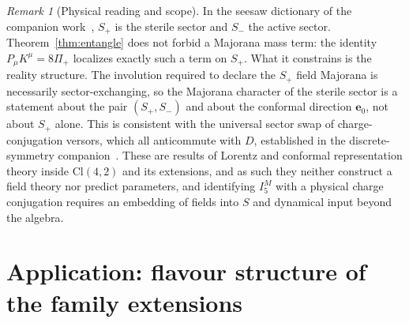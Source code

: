 \documentclass{birkjour}
\theoremstyle{definition}
\theoremstyle{remark}
\newtheorem{rem}[thm]{Remark}
\numberwithin{equation}{section}
\newcommand{\Cl}{\mathrm{Cl}}
\newcommand{\e}[1]{\bm{e}_{#1}}
\newenvironment{revblock}{}{}
\begin{document}
\begin{revblock}
\begin{rem}[Physical reading and scope]\label{rem:physical}
In the seesaw dictionary of the companion
work~\cite{Hansen2026seesaw}, $S_+$ is the sterile sector
and $S_-$ the active sector. Theorem~\ref{thm:entangle}
does not forbid a Majorana mass term: the identity
$P_\mu K^\mu=8\Pi_+$ localizes exactly such a term on
$S_+$. What it constrains is the reality structure. The
involution required to declare the $S_+$ field Majorana is
necessarily sector-exchanging, so the Majorana character of
the sterile sector is a statement about the pair
$(S_+,S_-)$ and about the conformal direction $\e{0}$, not
about $S_+$ alone. This is consistent with the universal
sector swap of charge-conjugation versors, which all
anticommute with $D$, established in the discrete-symmetry
companion~\cite{HansenCPT2026}. 
These are results of Lorentz and conformal representation
theory inside $\Cl(4,2)$ and its extensions, and as such they neither
construct a field theory nor predict parameters, and
identifying $I_5^{M}$ with a physical charge conjugation
requires an embedding of fields into $S$ and dynamical
input beyond the algebra.
\end{rem}
\end{revblock}


\section{Application: flavour structure of the family
extensions}\label{sec:flavour}
\end{document}
